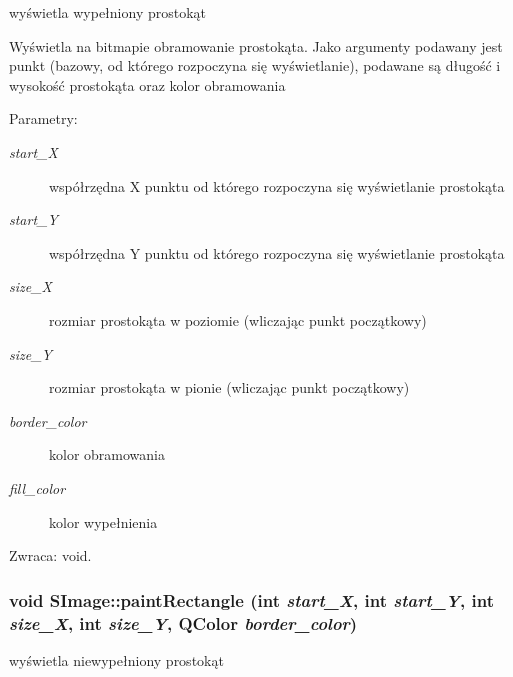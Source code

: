 wyświetla wypełniony prostokąt 

Wyświetla na bitmapie obramowanie prostokąta. Jako argumenty podawany jest punkt (bazowy, od którego rozpoczyna się wyświetlanie), podawane są długość i wysokość prostokąta oraz kolor obramowania \begin{Desc}
\item[Parametry:]
\begin{description}
\item[{\em start\_\-X}]współrzędna X punktu od którego rozpoczyna się wyświetlanie prostokąta \item[{\em start\_\-Y}]współrzędna Y punktu od którego rozpoczyna się wyświetlanie prostokąta \item[{\em size\_\-X}]rozmiar prostokąta w poziomie (wliczając punkt początkowy) \item[{\em size\_\-Y}]rozmiar prostokąta w pionie (wliczając punkt początkowy) \item[{\em border\_\-color}]kolor obramowania \item[{\em fill\_\-color}]kolor wypełnienia \end{description}
\end{Desc}
\begin{Desc}
\item[Zwraca:]void. \end{Desc}
\hypertarget{classSImage_d5707899d17b97884f85d3ea42bd548d}{
\subsubsection[{paintRectangle}]{\setlength{\rightskip}{0pt plus 5cm}void SImage::paintRectangle (int {\em start\_\-X}, \/  int {\em start\_\-Y}, \/  int {\em size\_\-X}, \/  int {\em size\_\-Y}, \/  QColor {\em border\_\-color})}}
\label{classSImage_d5707899d17b97884f85d3ea42bd548d}


wyświetla niewypełniony prostokąt 

